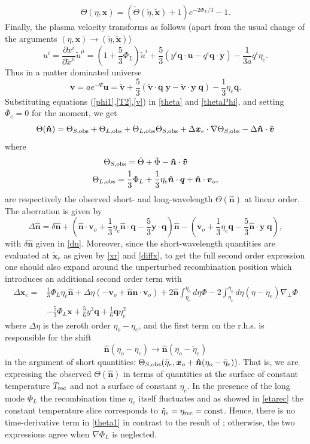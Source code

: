 \documentclass[12pt]{article}
\numberwithin{equation}{section}
\def\bsb{\boldsymbol}
\def\bea{\begin{eqnarray}}
\def\eea{\end{eqnarray}}
\def\be{\begin{equation}}
\def\ee{\end{equation}}
\def\d{\partial}
\def\n{\bsb{\hat n}}
\def\x{{\bsb x}}
\begin{document}
\be
\label{T2}
\Theta(\eta,\bsb x)=
(\tilde\Theta(\tilde\eta,\tilde \x)+1)e^{-2\Phi_L/3}-1.
\ee
Finally, the plasma velocity transforms as follows (apart from the usual change of the arguments $(\eta,\x)\to (\tilde \eta,\tilde \x)$)
\be
u^i = \frac{\d x^i}{\d {\tilde x}^\mu}{\tilde u}^\mu = (1+\frac{5}{3}\Phi_L){\tilde u}^i+\frac{5}{3}(y^i \bsb q\cdot \bsb u -q^i \bsb q \cdot \bsb y)-\frac{1}{3a} q^i \eta_e.
\ee
Thus in a matter dominated universe
\be
\label{v}
\bsb v=ae^{-\Psi}\bsb u=\bsb{\tilde v} +\frac{5}{3}(\bsb{\tilde v}\cdot \bsb q \; \bsb{y} - \bsb{\tilde v}\cdot \bsb{y}\; \bsb q)-\frac{1}{3}\eta_e \bsb q.
\ee
Substituting equations (\ref{phi1},\ref{T2},\ref{v}) in \eqref{theta} and \eqref{thetaPhi}, and setting $\bar\Phi_e=0$ for the moment, we get
\be
\label{theta1}
\Theta(\bsb{\hat n})=\Theta_{S,\rm obs}+\Theta_{L,\rm obs}+\Theta_{L,\rm obs}\Theta_{S,\rm obs}+\Delta\bsb x_e\cdot \nabla \Theta_{S,\rm obs} - \Delta\n \cdot \tilde{\bsb v}
\ee
where
\bea
\label{TS}
\Theta_{S,\rm obs}=\tilde \Theta+\tilde \Phi-\bsb{\hat n}\cdot \bsb{\tilde v}~~~~~~~~~~~\\
\label{TL}
\Theta_{L,\rm obs}=\frac{1}{3}\Phi_L+\frac{1}{3}\eta_e \bsb{\hat n}\cdot \bsb q +\bsb{\hat n}\cdot \bsb v_o,
\eea
are respectively the observed short- and long-wavelength $\Theta(\n)$ at linear order. The aberration is given by 
\be
\label{Dn}
\Delta\n =\delta \n+(\bsb{\hat n}\cdot \bsb v_o+\frac{1}{3}\eta_e \bsb{\hat n}\cdot \bsb q  - \frac{5}{3} \bsb y \cdot \bsb q)\bsb{\hat n} 
-(\bsb v_o+\frac{1}{3}\eta_e \bsb q  - \frac{5}{3}\n\cdot \bsb y \;\bsb q),
\ee
with $\delta\n$ given in \eqref{dn}. Moreover, since the short-wavelength quantities are evaluated at $\bsb{\tilde x}_e$ as given by \eqref{xr} and \eqref{diffx}, to get the full second order expression one should also expand around the unperturbed recombination position which introduces an additional second order term with 
\be
\label{delT}
\begin{split}
\Delta \bsb x_e=&\frac{1}{3}\Phi_L \eta_e \bsb{\hat n}+\Delta \eta(-\bsb v_o  +\bsb{\hat n} \bsb{\hat n}\cdot \bsb v_o)+2\bsb{\hat n} \int_{\eta_e}^{\eta_o} d\eta \Phi - 2\int_{\eta_e}^{\eta_o} d\eta (\eta-\eta_e) \nabla_\perp \Phi \\
&-\frac{5}{3}\Phi_L \bsb x +\frac{5}{6} y^2 \bsb q +\frac{1}{6}\bsb q \eta_e^2
\end{split}
\ee
where $\Delta \eta$ is the zeroth order $\eta_o - \eta_e$, and the first term on the r.h.s. is responsible for the shift 
\be
\n(\eta_o-\eta_e)\to \n(\eta_o-\tilde \eta_e)
\ee
in the argument of short quantities: $\Theta_{S,\rm obs}(\tilde \eta_e,\bsb x_o +\bsb{\hat n}(\eta_o-\tilde \eta_e))$. That is, we are expressing the observed $\Theta (\bsb{\hat n})$ in terms of quantities at the surface of constant temperature $T_{\rm rec}$ and not a surface of constant $\eta_e$. In the presence of the long mode $\Phi_L$ the recombination time $\eta_e$ itself fluctuates and as showed in \eqref{etarec} the constant temperature slice corresponds to $\tilde \eta_e=\eta_{\rm rec}=\rm const$. Hence, there is no time-derivative term in \eqref{theta1} in contrast to the result of \cite{Creminelli_squeezed}; otherwise, the two expressions agree when $\nabla\Phi_L$ is neglected.
\end{document}
